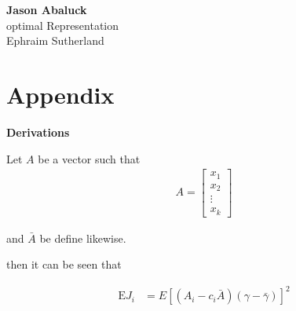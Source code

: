 \documentclass[12pt]{article}
\newcommand{\1}{\mathds{1}}
\newcommand{\E}{\mathrm{E}}
\begin{document}
\begin{center}
	{\large \bf Jason Abaluck }   \\ \large optimal Representation \\ Ephraim Sutherland
\end{center}

\tableofcontents








\section{Appendix}

\begin{center}
	{\large \bf Derivations }
\end{center}






% 




Let $A$ be a vector such that
\begin{align*}
	A = \begin{bmatrix}
		x_1 \\
		x_2 \\
		\vdots \\
		x_{k}
	\end{bmatrix}
\end{align*}

and $\bar{A}$ be define likewise.

then it can be seen that

\begin{align*}
    \E J_i &= E [(A_i - c_i \bar{A})(\gamma - \bar{\gamma})]^2 \\
\end{align*}


\end{document}
